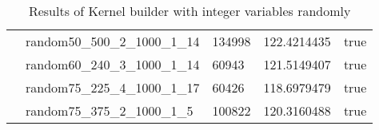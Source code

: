 \begin{table}[!htbp]
{\begin{tabular}{@{}lllll@{}}
            & random50\_500\_2\_1000\_1\_14 & 134998 & 122.4214435 & true \\  
            & random60\_240\_3\_1000\_1\_14 & 60943 & 121.5149407 & true \\  
            & random75\_225\_4\_1000\_1\_17 & 60426 & 118.6979479 & true \\  
            & random75\_375\_2\_1000\_1\_5 & 100822 & 120.3160488 & true \\  
            \bottomrule
        \end{tabular}
        }
    \caption{Results of Kernel builder with integer variables randomly}
    \label{tab:ker_int_random}
\end{table}
